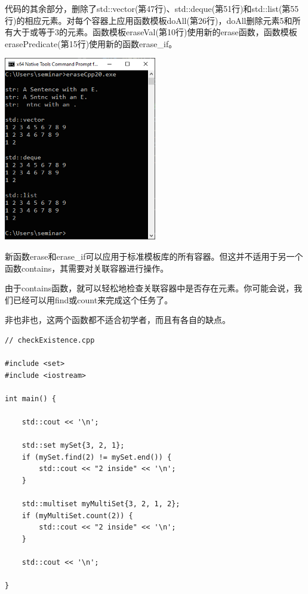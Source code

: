 代码的其余部分，删除了std::vector(第47行)、std::deque(第51行)和std::list(第55行)的相应元素。对每个容器上应用函数模板doAll(第26行)，doAll删除元素5和所有大于或等于3的元素。函数模板eraseVal(第10行)使用新的erase函数，函数模板erasePredicate(第15行)使用新的函数erase\_if。

\begin{center}
\includegraphics[width=0.5\textwidth]{content/3/chapter5/images/13.png}\\
\end{center}

新函数erase和erase\_if可以应用于标准模板库的所有容器。但这并不适用于另一个函数contains，其需要对关联容器进行操作。


由于contains函数，就可以轻松地检查关联容器中是否存在元素。你可能会说，我们已经可以用find或count来完成这个任务了。

非也非也，这两个函数都不适合初学者，而且有各自的缺点。

\begin{lstlisting}[style=styleCXX]
// checkExistence.cpp

#include <set>
#include <iostream>

int main() {

	std::cout << '\n';
	
	std::set mySet{3, 2, 1};
	if (mySet.find(2) != mySet.end()) {
		std::cout << "2 inside" << '\n';
	}
	
	std::multiset myMultiSet{3, 2, 1, 2};
	if (myMultiSet.count(2)) {
		std::cout << "2 inside" << '\n';
	}
	
	std::cout << '\n';

}
\end{lstlisting}


